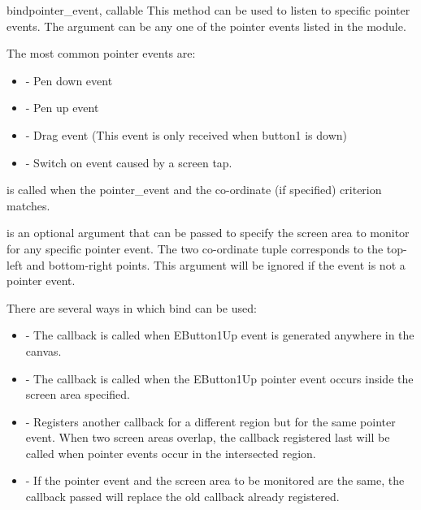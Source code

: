 \begin{methoddesc}[Canvas]{bind}{pointer_event, callable}
This method can be used to listen to specific pointer events. The
 argument can be any one of the pointer events listed in the
 module.

The most common pointer events are:

\begin{itemize}
\item {} - Pen down event 
\item {}   - Pen up event
\item {}        - Drag event (This event is only received when button1 is down)
\item {}    - Switch on event caused by a screen tap.
\end{itemize}

 is called when the pointer_event and the co-ordinate 
(if specified) criterion matches.

 is an optional argument that can be passed to
specify the screen area to monitor for any specific pointer event. The two
co-ordinate tuple corresponds to the top-left and bottom-right points. This
argument will be ignored if the event is not a pointer event.

There are several ways in which bind can be used:

\begin{itemize}
\item {} - The callback is called when
EButton1Up event is generated anywhere in the canvas.

\item {} - The 
callback is called when the EButton1Up pointer event occurs inside the screen
area specified.

\item {} - 
Registers another callback for a different region but for the same pointer
event. When two screen areas overlap, the callback registered last will be
called when pointer events occur in the intersected region. 

\item {} - If the
pointer event and the screen area to be monitored are the same, the callback
passed will replace the old callback already registered. 


\end{itemize}
\end{methoddesc}
